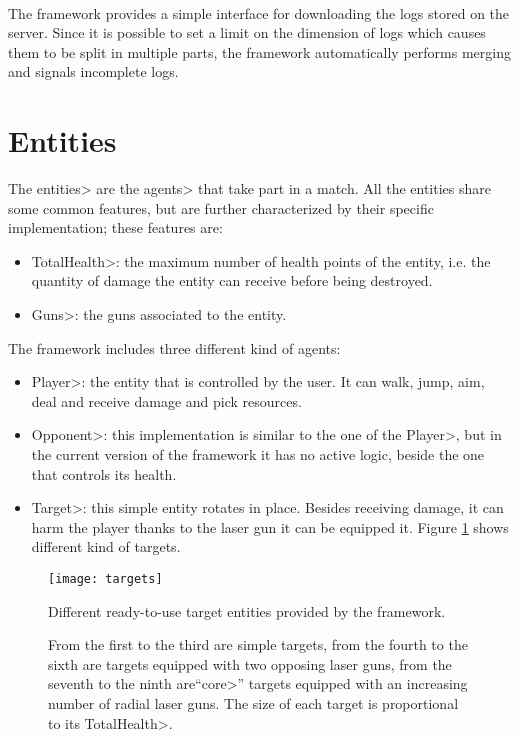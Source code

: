 \mbox{}\\

{\setlength{\parindent}{0cm}
The framework provides a simple interface for downloading the logs stored on the server. Since it is possible to set a limit on the dimension of logs which causes them to be split in multiple parts, the framework automatically performs merging and signals incomplete logs.
}


\section{Entities}

The \<entities> are the \<agents> that take part in a match. All the entities share some common features, but are further characterized by their specific implementation; these features are:

\begin{itemize}
\item \<TotalHealth>: the maximum number of health points of the entity, i.e. the quantity of damage the entity can receive before being destroyed.
\item \<Guns>: the guns associated to the entity.
\end{itemize}

The framework includes three different kind of agents:

\begin{itemize}
\item \<Player>: the entity that is controlled by the user. It can walk, jump, aim, deal and receive damage and pick resources.
\item \<Opponent>: this implementation is similar to the one of the \<Player>, but in the current version of the framework it has no active logic, beside the one that controls its health.
\item \<Target>: this simple entity rotates in place. Besides receiving damage, it can harm the player thanks to the laser gun it can be equipped it. Figure \ref{fig:targets} shows different kind of targets.
\end{itemize}

\begin{figure}
\centering
\texttt{[image: targets]}
\caption{Different ready-to-use target entities provided by the framework.}
\caption*{From the first to the third are simple targets, from the fourth to the sixth are targets equipped with two opposing laser guns, from the seventh to the ninth are``\<core>'' targets equipped with an increasing number of radial laser guns. The size of each target is proportional to its \<TotalHealth>.}
\label{fig:targets}
\end{figure}

